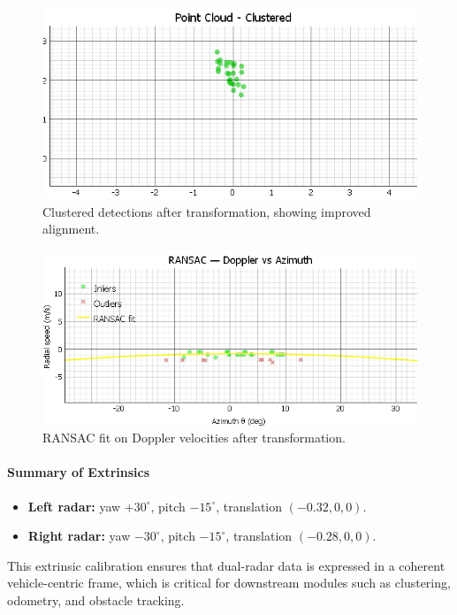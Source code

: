 \begin{figure}[!htbp]
    \centering
    \includegraphics[width=0.9\linewidth]{images/AFTERdualSensorCalibCluster_2mts.png}
    \caption{Clustered detections after transformation, showing improved alignment.}
    \label{fig:AFTERdualSensorCalibCluster_2mts}
\end{figure}

\begin{figure}[!htbp]
    \centering
    \includegraphics[width=0.9\linewidth]{images/AFTERdualSensorCalibRANSAC_2mts.png}
    \caption{RANSAC fit on Doppler velocities after transformation.}
    \label{fig:AFTERdualSensorCalibRANSAC_2mts}
\end{figure}

\vspace{1em}

\paragraph{Summary of Extrinsics}
\begin{itemize}
    \item \textbf{Left radar:} yaw $+30^\circ$, pitch $-15^\circ$, translation $(-0.32, 0, 0)$.
    \item \textbf{Right radar:} yaw $-30^\circ$, pitch $-15^\circ$, translation $(-0.28, 0, 0)$.
\end{itemize}

This extrinsic calibration ensures that dual-radar data is expressed in a coherent vehicle-centric frame, which is critical for downstream modules such as clustering, odometry, and obstacle tracking.
